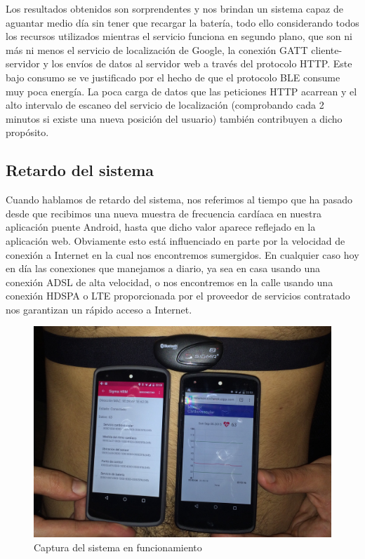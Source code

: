 Los resultados obtenidos son sorprendentes y nos brindan un sistema capaz de aguantar medio día sin tener que recargar la batería, todo ello considerando todos los recursos utilizados mientras el servicio funciona en segundo plano, que son ni más ni menos el servicio de localización de Google, la conexión GATT cliente-servidor y los envíos de datos al servidor web a través del protocolo HTTP. Este bajo consumo se ve justificado por el hecho de que el protocolo BLE consume muy poca energía. La poca carga de datos que las peticiones HTTP acarrean y el alto intervalo de escaneo del servicio de localización (comprobando cada 2 minutos si existe una nueva posición del usuario) también contribuyen a dicho propósito.

\subsection{Retardo del sistema}
Cuando hablamos de retardo del sistema, nos referimos al tiempo que ha pasado desde que recibimos una nueva muestra de frecuencia cardíaca en nuestra aplicación puente Android, hasta que dicho valor aparece reflejado en la aplicación web. Obviamente esto está influenciado en parte por la velocidad de conexión a Internet en la cual nos encontremos sumergidos. En cualquier caso hoy en día las conexiones que manejamos a diario, ya sea en casa usando una conexión ADSL de alta velocidad, o nos encontremos en la calle usando una conexión HDSPA o LTE proporcionada por el proveedor de servicios contratado nos garantizan un rápido acceso a Internet.

\begin{figure}[h] \centering
	\includegraphics[width=15cm, keepaspectratio]{graphs/FullSizeRender.png} \caption{Captura del sistema en funcionamiento}\label{fig:prueba}
\end{figure}

